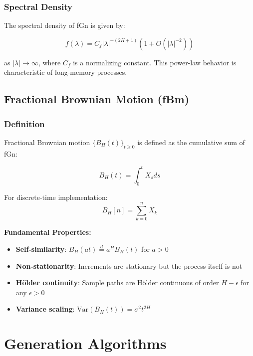 \documentclass[11pt,a4paper]{article}
\begin{document}
\subsubsection{Spectral Density}

The spectral density of fGn is given by:

\begin{equation}
f(\lambda) = C_f |\lambda|^{-(2H+1)} \left(1 + O(|\lambda|^{-2})\right)
\end{equation}

as $|\lambda| \to \infty$, where $C_f$ is a normalizing constant. This power-law behavior is characteristic of long-memory processes.

\subsection{Fractional Brownian Motion (fBm)}

\subsubsection{Definition}

Fractional Brownian motion $\{B_H(t)\}_{t \geq 0}$ is defined as the cumulative sum of fGn:

\begin{equation}
B_H(t) = \int_0^t X_s ds
\end{equation}

For discrete-time implementation:
\begin{equation}
B_H[n] = \sum_{k=0}^{n} X_k
\end{equation}

\textbf{Fundamental Properties:}
\begin{itemize}
    \item \textbf{Self-similarity}: $B_H(at) \stackrel{d}{=} a^H B_H(t)$ for $a > 0$
    \item \textbf{Non-stationarity}: Increments are stationary but the process itself is not
    \item \textbf{Hölder continuity}: Sample paths are Hölder continuous of order $H - \epsilon$ for any $\epsilon > 0$
    \item \textbf{Variance scaling}: $\text{Var}(B_H(t)) = \sigma^2 t^{2H}$
\end{itemize}

\section{Generation Algorithms}
\end{document}
